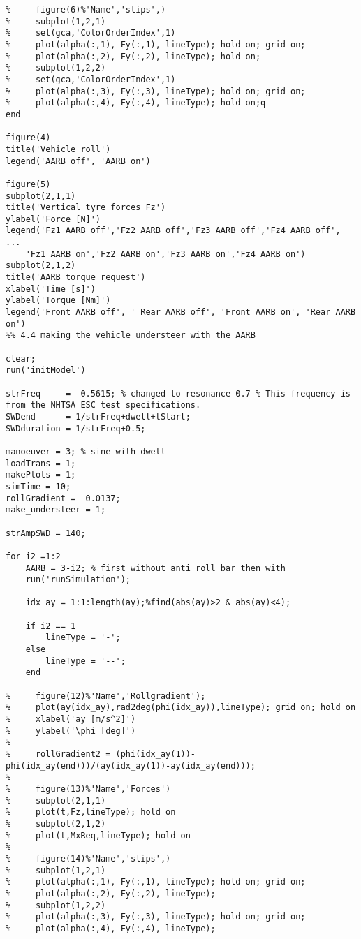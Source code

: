 \begin{lstlisting}
%     figure(6)%'Name','slips',)
%     subplot(1,2,1)
%     set(gca,'ColorOrderIndex',1)
%     plot(alpha(:,1), Fy(:,1), lineType); hold on; grid on;
%     plot(alpha(:,2), Fy(:,2), lineType); hold on;
%     subplot(1,2,2)
%     set(gca,'ColorOrderIndex',1)
%     plot(alpha(:,3), Fy(:,3), lineType); hold on; grid on;
%     plot(alpha(:,4), Fy(:,4), lineType); hold on;q
end

figure(4)
title('Vehicle roll')
legend('AARB off', 'AARB on')

figure(5)
subplot(2,1,1)
title('Vertical tyre forces Fz')
ylabel('Force [N]')
legend('Fz1 AARB off','Fz2 AARB off','Fz3 AARB off','Fz4 AARB off', ...
    'Fz1 AARB on','Fz2 AARB on','Fz3 AARB on','Fz4 AARB on')
subplot(2,1,2)
title('AARB torque request')
xlabel('Time [s]')
ylabel('Torque [Nm]')
legend('Front AARB off', ' Rear AARB off', 'Front AARB on', 'Rear AARB on')
%% 4.4 making the vehicle understeer with the AARB

clear;
run('initModel')

strFreq     =  0.5615; % changed to resonance 0.7 % This frequency is from the NHTSA ESC test specifications. 
SWDend      = 1/strFreq+dwell+tStart;
SWDduration = 1/strFreq+0.5;

manoeuver = 3; % sine with dwell 
loadTrans = 1;
makePlots = 1;
simTime = 10;
rollGradient =  0.0137;
make_understeer = 1;

strAmpSWD = 140;

for i2 =1:2
    AARB = 3-i2; % first without anti roll bar then with
    run('runSimulation');
    
    idx_ay = 1:1:length(ay);%find(abs(ay)>2 & abs(ay)<4);

    if i2 == 1
        lineType = '-';
    else
        lineType = '--';
    end
    
%     figure(12)%'Name','Rollgradient');
%     plot(ay(idx_ay),rad2deg(phi(idx_ay)),lineType); grid on; hold on
%     xlabel('ay [m/s^2]')
%     ylabel('\phi [deg]')
%     
%     rollGradient2 = (phi(idx_ay(1))-phi(idx_ay(end)))/(ay(idx_ay(1))-ay(idx_ay(end)));
%     
%     figure(13)%'Name','Forces')
%     subplot(2,1,1)
%     plot(t,Fz,lineType); hold on
%     subplot(2,1,2)
%     plot(t,MxReq,lineType); hold on
%     
%     figure(14)%'Name','slips',)
%     subplot(1,2,1)
%     plot(alpha(:,1), Fy(:,1), lineType); hold on; grid on;
%     plot(alpha(:,2), Fy(:,2), lineType);
%     subplot(1,2,2)
%     plot(alpha(:,3), Fy(:,3), lineType); hold on; grid on;
%     plot(alpha(:,4), Fy(:,4), lineType);
    

\end{lstlisting}
